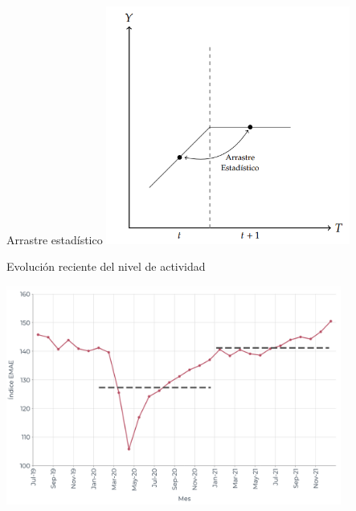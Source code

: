 \documentclass{beamer}
\begin{document}
\begin{frame}{Arrastre estadístico}
    \centering\includegraphics[width=8cm]{../Figures/C32.16.png}
\end{frame}

\begin{frame}{Evolución reciente del nivel de actividad}

    \centering\includegraphics[width=11cm]{../Figures/32.16.png}

\end{frame}
\end{document}
